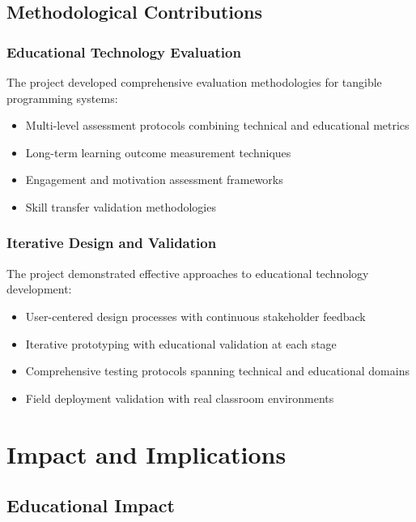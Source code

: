 \subsection{Methodological Contributions}

\subsubsection{Educational Technology Evaluation}

The project developed comprehensive evaluation methodologies for tangible programming systems:

\begin{itemize}
    \item Multi-level assessment protocols combining technical and educational metrics
    \item Long-term learning outcome measurement techniques
    \item Engagement and motivation assessment frameworks
    \item Skill transfer validation methodologies
\end{itemize}

\subsubsection{Iterative Design and Validation}

The project demonstrated effective approaches to educational technology development:

\begin{itemize}
    \item User-centered design processes with continuous stakeholder feedback
    \item Iterative prototyping with educational validation at each stage
    \item Comprehensive testing protocols spanning technical and educational domains
    \item Field deployment validation with real classroom environments
\end{itemize}

\section{Impact and Implications}

\subsection{Educational Impact}

